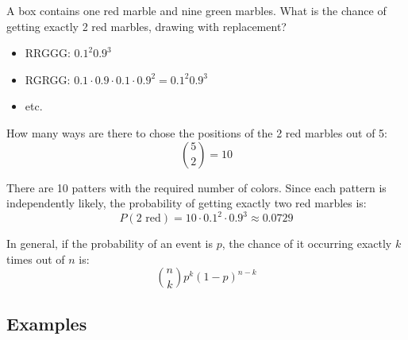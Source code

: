 \documentclass[landscape]{exam}
\begin{document}
  A box contains one red marble and nine green marbles. What is the chance of
  getting exactly 2 red marbles, drawing with replacement?

  \begin{itemize}
    \item RRGGG: $0.1^2 0.9^3$
    \item RGRGG: $0.1 \cdot 0.9 \cdot 0.1 \cdot 0.9^2 = 0.1^2 0.9^3$
    \item etc.
  \end{itemize}

  How many ways are there to chose the positions of the 2 red marbles out of 5:
  \[
    \binom{5}{2} = 10
  \]

  There are 10 patters with the required number of colors. Since each pattern is
  independently likely, the probability of getting exactly two red marbles is:
  \[
    P(\text{2 red}) = 10 \cdot 0.1^2 \cdot 0.9^3 \approx \boxed{ 0.0729 }
  \]

  In general, if the probability of an event is $p$, the chance of it occurring
  exactly $k$ times out of $n$ is:
  \[
    \binom{n}{k} p^k (1 - p)^{n - k}
  \]

  \subsection{Examples}
  
\end{document}
